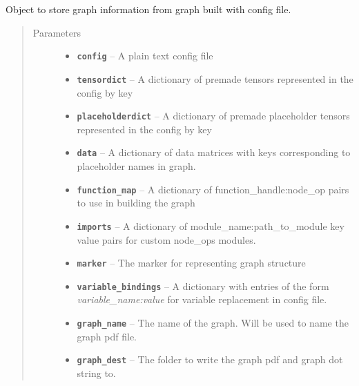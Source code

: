 \documentclass[letterpaper,10pt,english]{sphinxmanual}
\begin{document}
\begin{fulllineitems}
\label{config:config.AntGraph}
Object to store graph information from graph built with config file.
\begin{quote}\begin{description}
\item[{Parameters}] \leavevmode\begin{itemize}
\item {} 
\textbf{\texttt{config}} -- A plain text config file

\item {} 
\textbf{\texttt{tensordict}} -- A dictionary of premade tensors represented in the config by key

\item {} 
\textbf{\texttt{placeholderdict}} -- A dictionary of premade placeholder tensors represented in the config by key

\item {} 
\textbf{\texttt{data}} -- A dictionary of data matrices with keys corresponding to placeholder names in graph.

\item {} 
\textbf{\texttt{function\_map}} -- A dictionary of function\_handle:node\_op pairs to use in building the graph

\item {} 
\textbf{\texttt{imports}} -- A dictionary of module\_name:path\_to\_module key value pairs for custom node\_ops modules.

\item {} 
\textbf{\texttt{marker}} -- The marker for representing graph structure

\item {} 
\textbf{\texttt{variable\_bindings}} -- A dictionary with entries of the form  \emph{variable\_name:value} for variable replacement in config file.

\item {} 
\textbf{\texttt{graph\_name}} -- The name of the graph. Will be used to name the graph pdf file.

\item {} 
\textbf{\texttt{graph\_dest}} -- The folder to write the graph pdf and graph dot string to.


\end{itemize}
\end{description}
\end{quote}
\end{fulllineitems}
\end{document}

